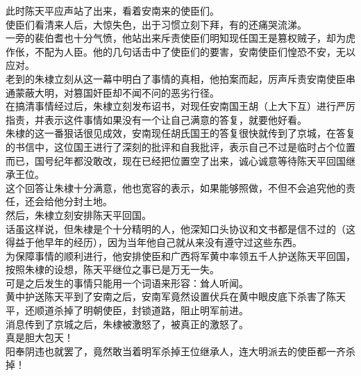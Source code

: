 \begin{multicols}{\theparacolNo}
此时陈天平应声站了出来，看着安南来的使臣们。\\

使臣们看清来人后，大惊失色，出于习惯立刻下拜，有的还痛哭流涕。\\

一旁的裴伯耆也十分气愤，他站出来斥责使臣们明知现任国王是篡权贼子，却为虎作伥，不配为人臣。他的几句话击中了使臣们的要害，安南使臣们惶恐不安，无以应对。\\

老到的朱棣立刻从这一幕中明白了事情的真相，他拍案而起，厉声斥责安南使臣串通蒙蔽大明，对篡国奸臣却不闻不问的恶劣行径。\\

在搞清事情经过后，朱棣立刻发布诏书，对现任安南国王胡（上大下互）进行严厉指责，并表示这件事情如果没有一个让自己满意的答复，就要他好看。\\

朱棣的这一番狠话很见成效，安南现任胡氏国王的答复很快就传到了京城，在答复的书信中，这位国王进行了深刻的批评和自我批评，表示自己不过是临时占个位置而已，国号纪年都没敢改，现在已经把位置空了出来，诚心诚意等待陈天平回国继承王位。\\

这个回答让朱棣十分满意，他也宽容的表示，如果能够照做，不但不会追究他的责任，还会给他分封土地。\\

然后，朱棣立刻安排陈天平回国。\\

话虽这样说，但朱棣是个十分精明的人，他深知口头协议和文书都是信不过的（这得益于他早年的经历），因为当年他自己就从来没有遵守过这些东西。\\

为保障事情的顺利进行，他安排使臣和广西将军黄中率领五千人护送陈天平回国，按照朱棣的设想，陈天平继位之事已是万无一失。\\

可是之后发生的事情只能用一个词语来形容：耸人听闻。\\

黄中护送陈天平到了安南之后，安南军竟然设置伏兵在黄中眼皮底下杀害了陈天平，还顺道杀掉了明朝使臣，封锁道路，阻止明军前进。\\

消息传到了京城之后，朱棣被激怒了，被真正的激怒了。\\

真是胆大包天！\\

阳奉阴违也就罢了，竟然敢当着明军杀掉王位继承人，连大明派去的使臣都一齐杀掉！\\


\end{multicols}
